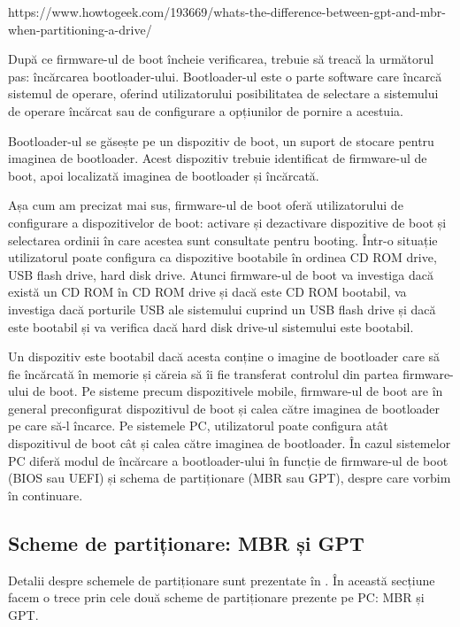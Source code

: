 https://www.howtogeek.com/193669/whats-the-difference-between-gpt-and-mbr-when-partitioning-a-drive/

După ce firmware-ul de boot încheie verificarea, trebuie să treacă la următorul
pas: încărcarea bootloader-ului. Bootloader-ul este o parte software care
încarcă sistemul de operare, oferind utilizatorului posibilitatea de selectare a
sistemului de operare încărcat sau de configurare a opțiunilor de pornire a
acestuia.

Bootloader-ul se găsește pe un dispozitiv de boot, un suport de stocare pentru
imaginea de bootloader. Acest dispozitiv trebuie identificat de firmware-ul de
boot, apoi localizată imaginea de bootloader și încărcată.

Așa cum am precizat mai sus, firmware-ul de boot oferă utilizatorului de
configurare a dispozitivelor de boot: activare și dezactivare dispozitive de
boot și selectarea ordinii în care acestea sunt consultate pentru booting.
Într-o situație utilizatorul poate configura ca dispozitive bootabile în ordinea
CD ROM drive, USB flash drive, hard disk drive. Atunci firmware-ul de boot va
investiga dacă există un CD ROM în CD ROM drive și dacă este CD ROM bootabil, va
investiga dacă porturile USB ale sistemului cuprind un USB flash drive și dacă
este bootabil și va verifica dacă hard disk drive-ul sistemului este bootabil.

Un dispozitiv este bootabil dacă acesta conține o imagine de bootloader care să
fie încărcată în memorie și căreia să îi fie transferat controlul din partea
firmware-ului de boot. Pe sisteme precum dispozitivele mobile, firmware-ul de
boot are în general preconfigurat dispozitivul de boot și calea către imaginea
de bootloader pe care să-l încarce. Pe sistemele PC, utilizatorul poate
configura atât dispozitivul de boot cât și calea către imaginea de bootloader.
În cazul sistemelor PC diferă modul de încărcare a bootloader-ului în funcție de
firmware-ul de boot (BIOS sau UEFI) și schema de partiționare (MBR sau GPT),
despre care vorbim în continuare.

\subsection{Scheme de partiționare: MBR și GPT}
\label{sec:boot-bootdev-partscheme}

Detalii despre schemele de partiționare sunt prezentate în
. În această secțiune
facem o trece prin cele două scheme de partiționare prezente pe PC: MBR și GPT.

